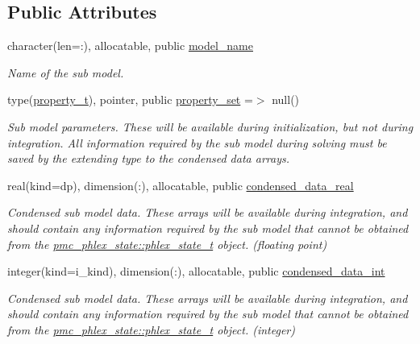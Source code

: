 \subsection*{Public Attributes}
\begin{DoxyCompactItemize}
\item 
character(len=\+:), allocatable, public \mbox{\hyperlink{structpmc__sub__model__data_1_1sub__model__data__t_a93d525020dba241f6c410e023716c5b3}{model\+\_\+name}}
\begin{DoxyCompactList}\small\item\em Name of the sub model. \end{DoxyCompactList}\item 
type(\mbox{\hyperlink{structpmc__property_1_1property__t}{property\+\_\+t}}), pointer, public \mbox{\hyperlink{structpmc__sub__model__data_1_1sub__model__data__t_aeb00155797966fc95e75ad14d45e7242}{property\+\_\+set}} =$>$ null()
\begin{DoxyCompactList}\small\item\em Sub model parameters. These will be available during initialization, but not during integration. All information required by the sub model during solving must be saved by the extending type to the condensed data arrays. \end{DoxyCompactList}\item 
real(kind=dp), dimension(\+:), allocatable, public \mbox{\hyperlink{structpmc__sub__model__data_1_1sub__model__data__t_afd5cb983e75931ea32d69ec1094890eb}{condensed\+\_\+data\+\_\+real}}
\begin{DoxyCompactList}\small\item\em Condensed sub model data. These arrays will be available during integration, and should contain any information required by the sub model that cannot be obtained from the \mbox{\hyperlink{structpmc__phlex__state_1_1phlex__state__t}{pmc\+\_\+phlex\+\_\+state\+::phlex\+\_\+state\+\_\+t}} object. (floating point) \end{DoxyCompactList}\item 
integer(kind=i\+\_\+kind), dimension(\+:), allocatable, public \mbox{\hyperlink{structpmc__sub__model__data_1_1sub__model__data__t_af236c8e807d10e3bd5e75fb26e41ea0e}{condensed\+\_\+data\+\_\+int}}
\begin{DoxyCompactList}\small\item\em Condensed sub model data. These arrays will be available during integration, and should contain any information required by the sub model that cannot be obtained from the \mbox{\hyperlink{structpmc__phlex__state_1_1phlex__state__t}{pmc\+\_\+phlex\+\_\+state\+::phlex\+\_\+state\+\_\+t}} object. (integer) \end{DoxyCompactList}\end{DoxyCompactItemize}
